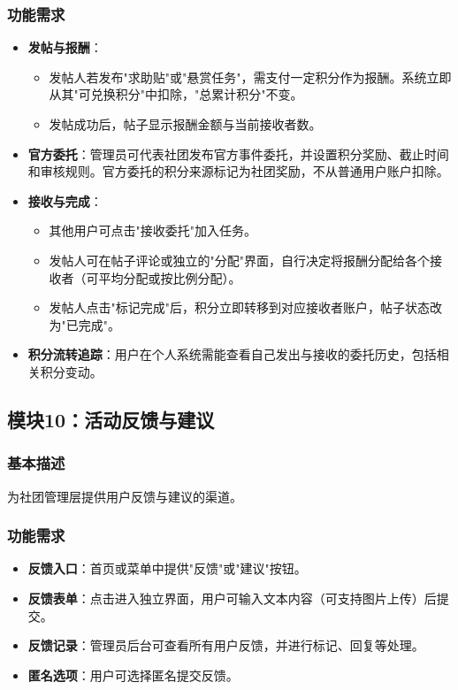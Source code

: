 \documentclass[a4paper,12pt]{article}
\begin{document}
\subsubsection{功能需求}
\begin{itemize}
    \item \textbf{发帖与报酬}：
        \begin{itemize}
            \item 发帖人若发布"求助贴"或"悬赏任务"，需支付一定积分作为报酬。系统立即从其"可兑换积分"中扣除，"总累计积分"不变。
            \item 发帖成功后，帖子显示报酬金额与当前接收者数。
        \end{itemize}
    \item \textbf{官方委托}：管理员可代表社团发布官方事件委托，并设置积分奖励、截止时间和审核规则。官方委托的积分来源标记为社团奖励，不从普通用户账户扣除。
    \item \textbf{接收与完成}：
        \begin{itemize}
            \item 其他用户可点击"接收委托"加入任务。
            \item 发帖人可在帖子评论或独立的"分配"界面，自行决定将报酬分配给各个接收者（可平均分配或按比例分配）。
            \item 发帖人点击"标记完成"后，积分立即转移到对应接收者账户，帖子状态改为"已完成"。
        \end{itemize}
    \item \textbf{积分流转追踪}：用户在个人系统需能查看自己发出与接收的委托历史，包括相关积分变动。
\end{itemize}

\subsection{模块10：活动反馈与建议}
\subsubsection{基本描述}
为社团管理层提供用户反馈与建议的渠道。

\subsubsection{功能需求}
\begin{itemize}
    \item \textbf{反馈入口}：首页或菜单中提供"反馈"或"建议"按钮。
    \item \textbf{反馈表单}：点击进入独立界面，用户可输入文本内容（可支持图片上传）后提交。
    \item \textbf{反馈记录}：管理员后台可查看所有用户反馈，并进行标记、回复等处理。
    \item \textbf{匿名选项}：用户可选择匿名提交反馈。
\end{itemize}
\end{document}

